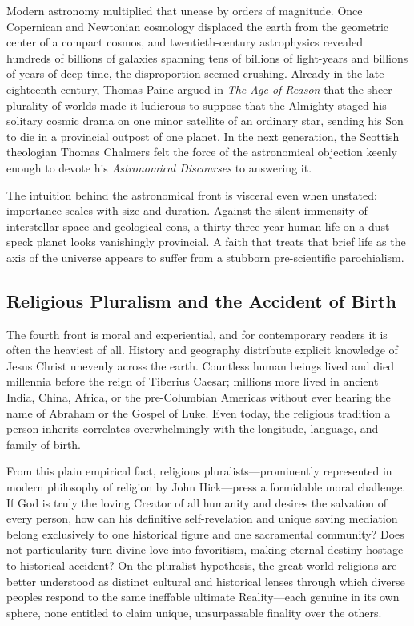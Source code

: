 Modern astronomy multiplied that unease by orders of magnitude. Once Copernican and Newtonian cosmology displaced the earth from the geometric center of a compact cosmos, and twentieth-century astrophysics revealed hundreds of billions of galaxies spanning tens of billions of light-years and billions of years of deep time, the disproportion seemed crushing. Already in the late eighteenth century, Thomas Paine argued in \textit{The Age of Reason} that the sheer plurality of worlds made it ludicrous to suppose that the Almighty staged his solitary cosmic drama on one minor satellite of an ordinary star, sending his Son to die in a provincial outpost of one planet. In the next generation, the Scottish theologian Thomas Chalmers felt the force of the astronomical objection keenly enough to devote his \textit{Astronomical Discourses} to answering it.

The intuition behind the astronomical front is visceral even when unstated: importance scales with size and duration. Against the silent immensity of interstellar space and geological eons, a thirty-three-year human life on a dust-speck planet looks vanishingly provincial. A faith that treats that brief life as the axis of the universe appears to suffer from a stubborn pre-scientific parochialism.

\subsection{Religious Pluralism and the Accident of Birth}

The fourth front is moral and experiential, and for contemporary readers it is often the heaviest of all. History and geography distribute explicit knowledge of Jesus Christ unevenly across the earth. Countless human beings lived and died millennia before the reign of Tiberius Caesar; millions more lived in ancient India, China, Africa, or the pre-Columbian Americas without ever hearing the name of Abraham or the Gospel of Luke. Even today, the religious tradition a person inherits correlates overwhelmingly with the longitude, language, and family of birth.

From this plain empirical fact, religious pluralists---prominently represented in modern philosophy of religion by John Hick---press a formidable moral challenge. If God is truly the loving Creator of all humanity and desires the salvation of every person, how can his definitive self-revelation and unique saving mediation belong exclusively to one historical figure and one sacramental community? Does not particularity turn divine love into favoritism, making eternal destiny hostage to historical accident? On the pluralist hypothesis, the great world religions are better understood as distinct cultural and historical lenses through which diverse peoples respond to the same ineffable ultimate Reality---each genuine in its own sphere, none entitled to claim unique, unsurpassable finality over the others.


